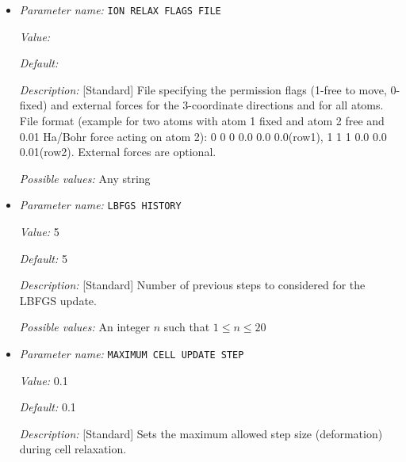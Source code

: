 \begin{itemize}
{\it Value:} LBFGS


{\it Default:} LBFGS


{\it Description:} [Standard] Method for Ion relaxation solver. LBFGS is the default


{\it Possible values:} Any one of BFGS, LBFGS, CGPRP
\item {\it Parameter name:} {\tt ION RELAX FLAGS FILE}
\label{parameters:Geometry/Optimization/ION RELAX FLAGS FILE}
\label{parameters:Geometry/Optimization/ION_20RELAX_20FLAGS_20FILE}


{\it Value:} 


{\it Default:} 


{\it Description:} [Standard] File specifying the permission flags (1-free to move, 0-fixed) and external forces for the 3-coordinate directions and for all atoms. File format (example for two atoms with atom 1 fixed and atom 2 free and 0.01 Ha/Bohr force acting on atom 2): 0 0 0 0.0 0.0 0.0(row1), 1 1 1 0.0 0.0 0.01(row2). External forces are optional.


{\it Possible values:} Any string
\item {\it Parameter name:} {\tt LBFGS HISTORY}
\label{parameters:Geometry/Optimization/LBFGS HISTORY}
\label{parameters:Geometry/Optimization/LBFGS_20HISTORY}


{\it Value:} 5


{\it Default:} 5


{\it Description:} [Standard] Number of previous steps to considered for the LBFGS update.


{\it Possible values:} An integer $n$ such that $1\leq n \leq 20$
\item {\it Parameter name:} {\tt MAXIMUM CELL UPDATE STEP}
\label{parameters:Geometry/Optimization/MAXIMUM CELL UPDATE STEP}
\label{parameters:Geometry/Optimization/MAXIMUM_20CELL_20UPDATE_20STEP}


{\it Value:} 0.1


{\it Default:} 0.1


{\it Description:} [Standard] Sets the maximum allowed step size (deformation) during cell relaxation.



\end{itemize}
